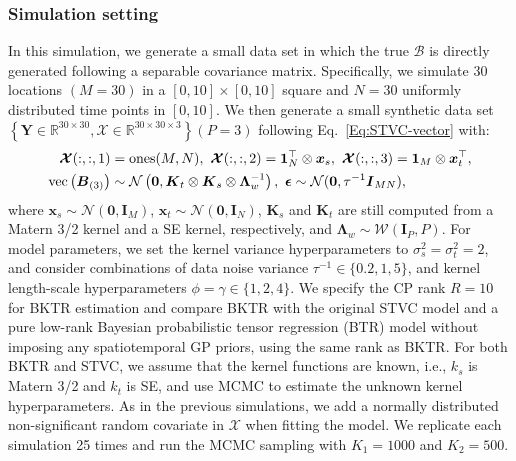 \documentclass[12pt]{article}
\newcommand{\bd}[1]{\boldsymbol{#1}}
\begin{document}
\subsubsection{Simulation setting} 
In this simulation, we generate a small data set in which the true $\boldsymbol{\mathcal{B}}$ is directly generated following a separable covariance matrix. Specifically, we simulate 30 locations $(M=30)$ in a $[0,10]\times[0,10]$ square and $N=30$ uniformly distributed time points in $[0,10]$. We then generate a small synthetic data set ${\left\{\boldsymbol{Y}\in\mathbb{R}^{30\times30},\boldsymbol{\mathcal{X}}\in\mathbb{R}^{30\times30\times3}\right\} (P=3)}$ following Eq.~\eqref{Eq:STVC-vector} with:
\begin{equation} \notag
\begin{aligned}
    \bd{\cal{X}}(:,:,1)&=\operatorname{ones}(M,N),\ 
    \bd{\cal{X}}(:,:,2)=\boldsymbol{1}_{N}^{\top}\otimes\boldsymbol{x}_{s},\ \bd{\cal{X}}(:,:,3)=\boldsymbol{1}_{M}\otimes\boldsymbol{x}_{t}^{\top},
    \\
    \operatorname{vec}\left(\boldsymbol{B}_{(3)}\right)&\sim\mathcal{N}\left(\boldsymbol{0},\boldsymbol{K}_{t}\otimes\boldsymbol{K}_{s}\otimes\boldsymbol{\Lambda}_{w}^{-1}\right),~\boldsymbol{\epsilon}\sim\mathcal{N}(\boldsymbol{0},\tau^{-1}\boldsymbol{I}_{MN}),
\end{aligned}
\end{equation}
where ${\boldsymbol{x}_{s}\sim\mathcal{N}(\bd{0},\boldsymbol{I}_{M})}$, ${\boldsymbol{x}_{t}\sim\mathcal{N}(\bd{0},\boldsymbol{I}_{N})}$, ${\boldsymbol{K}_{s}}$ and ${\boldsymbol{K}_{t}}$ are still computed from a Matern 3/2 kernel and a SE kernel, respectively, and ${\boldsymbol{\Lambda}_{w}\sim\mathcal{W}(\boldsymbol{I}_{P},P)}$. For model parameters, we set the kernel variance hyperparameters to $\sigma_s^2=\sigma_t^2=2$, and consider combinations of data noise variance $\tau^{-1}\in\{0.2,1,5\}$, and kernel length-scale hyperparameters $\phi=\gamma\in\{1,2,4\}$. We specify the CP rank ${R=10}$ for BKTR estimation and compare BKTR with the original STVC model \citep{gelfand2003spatial} and a pure low-rank Bayesian probabilistic tensor regression (BTR) model without imposing any spatiotemporal GP priors, using the same rank as BKTR. %
For both BKTR and STVC, we assume that the kernel functions are known, i.e., $k_s$ is Matern 3/2 and $k_t$ is SE, and use MCMC to estimate the unknown kernel hyperparameters. As in the previous simulations, we add a normally distributed non-significant random covariate in $\boldsymbol{\mathcal{X}}$ when fitting the model. We replicate each simulation 25 times and run the MCMC sampling with $K_1=1000$ and $K_2=500$.
\end{document}
